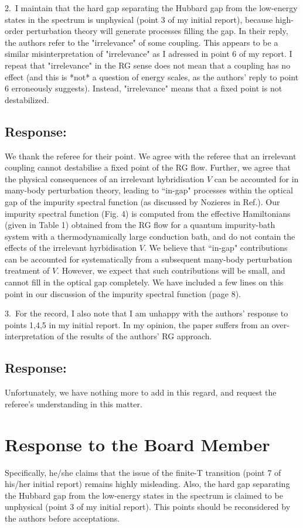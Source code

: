 \documentclass{article}
\newcommand{\response}[1]{{\color{blue}\subsection*{Response:}{#1}\vspace*{10pt}}}
\begin{document}
2.~I maintain that the hard gap separating the Hubbard gap from the low-energy states in the spectrum is unphysical (point 3 of my initial report), because high-order perturbation theory will generate processes filling the gap. In their reply, the authors refer to the "irrelevance" of some coupling. This appears to be a similar misinterpretation of "irrelevance" as I adressed in point 6 of my report. I repeat that "irrelevance" in the RG sense does not mean that a coupling has no effect (and this is *not* a question of energy scales, as the authors' reply to point 6 erroneously suggests). Instead, "irrelevance" means that a fixed point is not destabilized.

\response{
	We thank the referee for their point. We agree with the referee that an irrelevant coupling cannot destabilise a fixed point of the RG flow. Further, we agree that the physical consequences of an irrelevant hybridisation \(V\) can be accounted for in many-body perturbation theory, leading to ``in-gap" processes within the optical gap of the impurity spectral function (as discussed by Nozieres in Ref.\cite{nozieres_dmft}). Our impurity spectral function (Fig. 4) is computed from the effective Hamiltonians (given in Table 1) obtained from the RG flow for a quantum impurity-bath system with a thermodynamically large conduction bath, and do not contain the effects of the irrelevant hyrbidisation $V$. We believe that ``in-gap" contributions can be accounted for systematically from a subsequent many-body perturbation treatment of $V$. However, we expect that such contributions will be small, and cannot fill in the optical gap completely. We have included a few lines on this point in our discussion of the impurity spectral function (page 8).
}

3.~For the record, I also note that I am unhappy with the authors' response to points 1,4,5 in my initial report. In my opinion, the paper suffers from an over-interpretation of the results of the authors' RG approach.

\response{
Unfortunately, we have nothing more to add in this regard, and request the referee's understanding in this matter.
}

\section*{Response to the Board Member}
Specifically, he/she claims that  the issue of the finite-T transition (point 7 of his/her initial report) remains highly misleading.  Also, the hard gap separating the Hubbard gap from the low-energy states in the spectrum is claimed to be unphysical (point 3 of my initial report). This points should be reconsidered by the authors before acceptations.
\end{document}
